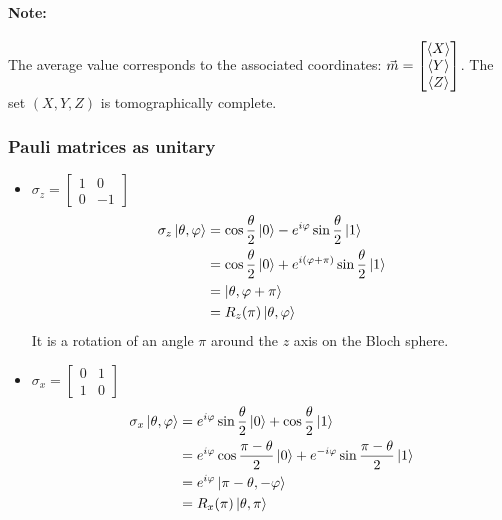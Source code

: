 \documentclass{article}
\begin{document}
\paragraph{Note: } The average value corresponds to the associated coordinates:
 $\vec{m} = \begin{bmatrix} \braket{X} \\ \braket{Y} \\ \braket{Z}
 \end{bmatrix}$. The set $(X, Y, Z)$ is tomographically complete.

\subsubsection*{Pauli matrices as unitary}

\begin{itemize}[label=-]
    \item $\sigma_z = \begin{bmatrix} 1 & 0 \\ 0 & -1 \end{bmatrix}$
    \begin{equation}
        \begin{aligned}
            \sigma_z\ket{\theta, \varphi}
                & = \cos \frac{\theta}{2}\ket{0} - e^{i\varphi}\sin\frac{\theta}{2}\ket{1} \\
                & = \cos \frac{\theta}{2}\ket{0} + e^{i(\varphi + \pi)}\sin\frac{\theta}{2}\ket{1} \\
                & = \ket{\theta, \varphi + \pi} \\
                & = R_z(\pi)\ket{\theta, \varphi}
        \end{aligned}
    \end{equation}
    It is a rotation of an angle $\pi$ around the $z$ axis on the Bloch sphere.

    \item $\sigma_x = \begin{bmatrix} 0 & 1 \\ 1 & 0 \end{bmatrix}$
    \begin{equation}
        \begin{aligned}
            \sigma_x\ket{\theta, \varphi}
                & = e^{i\varphi}\sin\frac{\theta}{2}\ket{0} + \cos\frac{\theta}{2}\ket{1} \\
                & = e^{i\varphi}\cos\frac{\pi-\theta}{2}\ket{0} +
                e^{-i\varphi}\sin\frac{\pi-\theta}{2}\ket{1} \\
                & = e^{i\varphi}\ket{\pi - \theta, -\varphi} \\
                & = R_x(\pi)\ket{\theta, \pi}
        \end{aligned}
    \end{equation}


\end{itemize}
\end{document}
